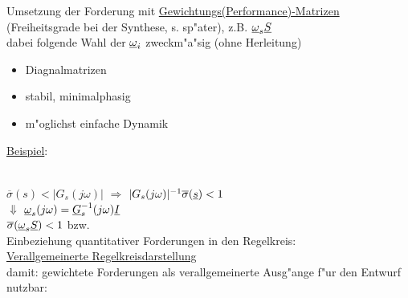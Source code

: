 \documentclass[openany,a4paper,11pt]{book}
\begin{document}
Umsetzung der Forderung mit \uline{Gewichtungs(Performance)-Matrizen} (Freiheitsgrade bei der Synthese, s. sp"ater), z.B. $\uline{\omega}_s\uline{S}$\\
dabei folgende Wahl der $\uline{\omega}_i$ zweckm"a"sig (ohne Herleitung)\begin{itemize}
    \item Diagnalmatrizen
    \item stabil, minimalphasig
    \item m"oglichst einfache Dynamik
\end{itemize}
\uline{Beispiel}:\\
\\
$\overline{\sigma}(s)<|G_s(j\omega)|$ $\Rightarrow$ $|G_s(j\omega)|^{-1}\overline{\sigma}(\uline{s})<1$\\
\quad \quad \quad $\Downarrow$ $\uline{\omega}_s(j\omega)=\uline{G}_s^{-1}(j\omega)\uline{I}$\\
$\overline{\sigma}(\uline{\omega}_s\uline{S})<1$ bzw. \\
Einbeziehung quantitativer Forderungen in den Regelkreis:\\
\uline{Verallgemeinerte Regelkreisdarstellung} \\
damit: gewichtete Forderungen als verallgemeinerte Ausg"ange f"ur den Entwurf nutzbar: 
\end{document}
